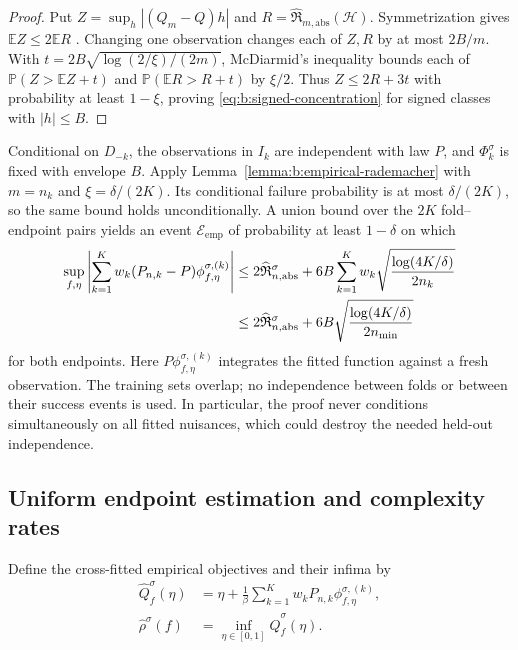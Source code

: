 \begin{proof}
Put $Z=\sup_h|(Q_m-Q)h|$ and
$R=\widehat{\mathfrak R}_{m,\mathrm{abs}}(\mathcal H)$.
Symmetrization gives $\mathbb EZ\leq2\mathbb ER$
\cite{bartlett2002rademacher,van1996weak}. Changing one observation changes
each of $Z,R$ by at most $2B/m$. With
$t=2B\sqrt{\log(2/\xi)/(2m)}$, McDiarmid's inequality bounds each of
$\mathbb P(Z>\mathbb EZ+t)$ and $\mathbb P(\mathbb ER>R+t)$ by $\xi/2$.
Thus $Z\leq2R+3t$ with probability at least $1-\xi$, proving
\eqref{eq:b:signed-concentration} for signed classes with $|h|\leq B$.
\end{proof}

Conditional on $D_{-k}$, the observations in $I_k$ are independent with
law $P$, and $\Phi_k^\sigma$ is fixed with envelope $B$.
Apply Lemma~\ref{lemma:b:empirical-rademacher} with
$m=n_k$ and $\xi=\delta/(2K)$. Its conditional failure probability is
at most $\delta/(2K)$, so the same bound holds unconditionally.
A union bound over the $2K$ fold--endpoint pairs yields an event
$\mathcal E_{\mathrm{emp}}$ of probability at least $1-\delta$ on which
\begin{align}
 \sup_{f,\eta}\left|
 \sum_{k=1}^K w_k(P_{n,k}-P)\phi^{\sigma,(k)}_{f,\eta}
 \right|
 &\leq2\widehat{\mathfrak R}_{n,\mathrm{abs}}^\sigma
 +6B\sum_{k=1}^K w_k\sqrt{\frac{\log(4K/\delta)}{2n_k}}\notag\\
 &\leq2\widehat{\mathfrak R}_{n,\mathrm{abs}}^\sigma
 +6B\sqrt{\frac{\log(4K/\delta)}{2n_{\min}}}
 \label{eq:b:fold-bound}
\end{align}
for both endpoints. Here $P\phi^{\sigma,(k)}_{f,\eta}$ integrates the
fitted function against a fresh observation. The training sets overlap;
no independence between folds or between their success events is used.
In particular, the proof never conditions simultaneously on all fitted
nuisances, which could destroy the needed held-out independence.

\subsection{Uniform endpoint estimation and complexity rates}
\label{app:uniform-estimation}

Define the cross-fitted empirical objectives and their infima by
\begin{equation}
 \begin{aligned}
 \widehat Q_f^\sigma(\eta)&=\eta+\frac1\beta
 \sum_{k=1}^K w_kP_{n,k}\phi^{\sigma,(k)}_{f,\eta},\\
 \widehat\rho^\sigma(f)&=\inf_{\eta\in[0,1]}\widehat Q_f^\sigma(\eta).
 \end{aligned}
 \label{eq:b:empirical-objectives}
\end{equation}

